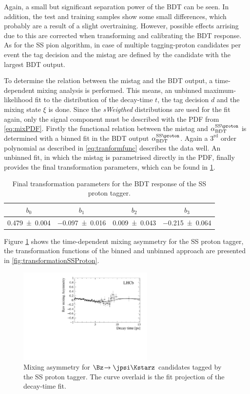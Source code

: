 Again, a small but significant separation power of the BDT can be seen.
In addition, the test and training samples show some small differences, which probably are a result of a slight overtraining.
However, possible effects arrising due to this are corrected when transforming and calibrating the BDT response.
As for the SS pion algorithm, in case of multiple tagging-proton candidates per event the tag decision and the mistag are defined by the candidate with the largest BDT output.

To determine the relation between the mistag and the BDT output, a time-dependent mixing analysis is performed.
This means, an unbinned maximum-likelihood fit to the distribution of the decay-time $t$, the tag decision $d$ and the mixing state $\xi$ is done.
Since the \emph{sWeigthed} distributions are used for the fit again, only the signal component must be described with the PDF from \cref{eq:mixPDF}.
Firstly the functional relation between the mistag and $\alpha^{\text{SS}\proton}_\text{BDT}$ is determined with a binned fit in the BDT output $\alpha^{\text{SS}\proton}_\text{BDT}$.
Again a $3^{\text{rd}}$ order polynomial as described in \cref{eq:tranformfunc} describes the data well.
An unbinned fit, in which the mistag is parametrised directly in the PDF, finally provides the final transformation parameters, which can be found in \cref{tab:transformSSProton}.
\begin{table}[tbp]
	\centering
	\caption{Final transformation parameters for the BDT response of the SS proton tagger.}
	\begin{tabular}{cccc}
		\toprule
		$b_0$ & $b_1$ & $b_2$ & $b_3$ \\
		\midrule
		\num{0.479\pm0.004} & \num{-0.097\pm0.016} & \num{0.009\pm0.043} & \num{-0.215\pm0.064} \\
		\bottomrule
	\end{tabular}
	\label{tab:transformSSProton}
\end{table}
Figure \ref{fig:MixasymmetrieSSProton} shows the time-dependent mixing asymmetry for the SS proton tagger, the transformation functions of the binned and unbinned approach are presented in \cref{fig:transformationSSProton}.
\begin{figure}[tbp]
	\begin{center}
		\includegraphics[width=0.6\textwidth]{08FlavourTagging/figs/Asymmetry_SSProton.pdf}
	\end{center}
	\caption{Mixing asymmetry for $\Bz\!\to\jpsi\Kstarz$ candidates tagged by the SS proton tagger.
	The curve overlaid is the fit projection of the decay-time fit.}
	\label{fig:MixasymmetrieSSProton}
\end{figure}
